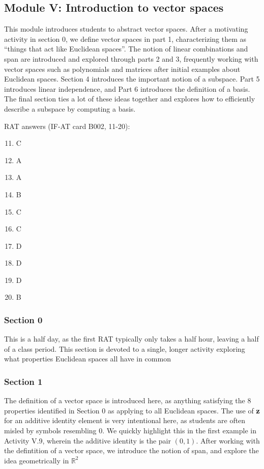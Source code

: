 \documentclass{article}
\begin{document}
\subsection*{Module V: Introduction to vector spaces}
This module introduces students to abstract vector spaces.  After a motivating activity in section 0, we define vector spaces in part 1, characterizing them as ``things that act like Euclidean spaces''.  The notion of linear combinations and span are introduced and explored through parts 2 and 3, frequently working with vector spaces such as polynomials and matrices after initial examples about Euclidean spaces.  Section 4 introduces the important notion of a subspace.  Part 5 introduces linear independence, and Part 6 introduces the definition of a basis.  The final section ties a lot of these ideas together and explores how to efficiently describe a subspace by computing a basis.

RAT answers (IF-AT card B002, 11-20):
\begin{multicols}{10}
\begin{enumerate}[1)]
\setcounter{enumi}{10}
\item C
\item A
\item A
\item B
\item C
\item C
\item D
\item D
\item D
\item B
\end{enumerate}
\end{multicols}

\subsubsection*{Section 0}
This is a half day, as the first RAT typically only takes a half hour, leaving a half of a class period.  This section is devoted to a single, longer activity exploring what properties Euclidean spaces all have in common

\subsubsection*{Section 1}
The definition of a vector space is introduced here, as anything satisfying the 8 properties identified in Section 0 as applying to all Euclidean spaces.  The use of $\bf{z}$ for an additive identity element is very intentional here, as students are often misled by symbols resembling $0$.  We quickly highlight this in the first example in Activity V.9, wherein the additive identity is the pair $(0,1)$.  After working with the defintition of a vector space, we introduce the notion of span, and explore the idea geometrically in $\mathbb{R}^2$
\end{document}
